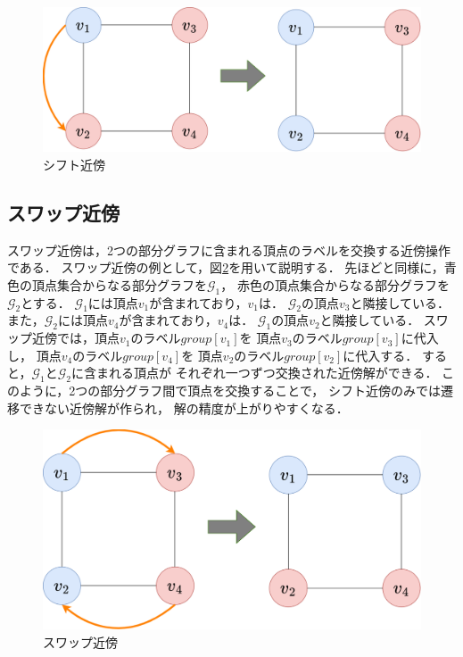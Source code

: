\begin{figure}[htbp]
  \centering
  \includegraphics[scale=0.2]{img/shift-neighbor.png}
  \caption{シフト近傍}
  \label{shift-neighbor}
\end{figure}

\subsection{スワップ近傍}

スワップ近傍は，2つの部分グラフに含まれる頂点のラベルを交換する近傍操作である．
スワップ近傍の例として，図\ref{swap-neighbor}を用いて説明する．
先ほどと同様に，青色の頂点集合からなる部分グラフを$\mathcal{G}_1$，
赤色の頂点集合からなる部分グラフを$\mathcal{G}_2$とする．
$\mathcal{G}_1$には頂点$v_1$が含まれており，$v_1$は．
$\mathcal{G}_2$の頂点$v_3$と隣接している．
また，$\mathcal{G}_2$には頂点$v_4$が含まれており，$v_4$は．
$\mathcal{G}_1$の頂点$v_2$と隣接している．
スワップ近傍では，頂点$v_1$のラベル$group[v_1]$を
頂点$v_3$のラベル$group[v_3]$に代入し，
頂点$v_4$のラベル$group[v_4]$を
頂点$v_2$のラベル$group[v_2]$に代入する．
すると，$\mathcal{G}_1$と$\mathcal{G}_2$に含まれる頂点が
それぞれ一つずつ交換された近傍解ができる．
このように，2つの部分グラフ間で頂点を交換することで，
シフト近傍のみでは遷移できない近傍解が作られ，
解の精度が上がりやすくなる．

\begin{figure}[htbp]
  \centering
  \includegraphics[scale=0.2]{img/swap-neighbor.png}
  \caption{スワップ近傍}
  \label{swap-neighbor}
\end{figure}

